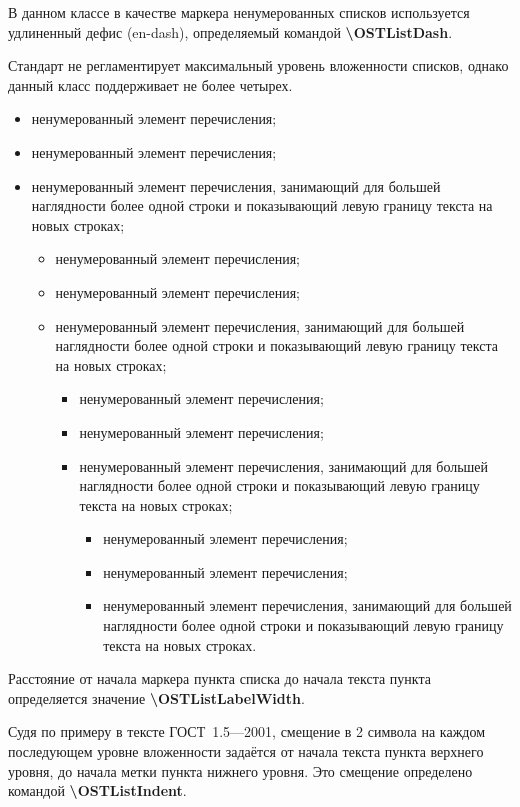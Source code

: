 \documentclass[12pt, twoside, final]{ruost}
\newcommand{\txtcmd}[1]{\textbf{\textbackslash{}#1}}
\begin{document}
\begin{OST}
				\point В данном классе в качестве маркера ненумерованных списков используется удлиненный дефис (en-dash), определяемый командой \txtcmd{OSTListDash}.
				
				\point Стандарт не регламентирует максимальный уровень вложенности списков, однако данный класс поддерживает не более четырех.
				
				\begin{itemize}
					\item ненумерованный элемент перечисления;
					\item ненумерованный элемент перечисления;
					\item ненумерованный элемент перечисления, занимающий для большей наглядности более одной строки и показывающий левую границу текста на новых строках;
					\begin{itemize}
						\item ненумерованный элемент перечисления;
						\item ненумерованный элемент перечисления;
						\item ненумерованный элемент перечисления, занимающий для большей наглядности более одной строки и показывающий левую границу текста на новых строках;
						\begin{itemize}
							\item ненумерованный элемент перечисления;
							\item ненумерованный элемент перечисления;
							\item ненумерованный элемент перечисления, занимающий для большей наглядности более одной строки и показывающий левую границу текста на новых строках;
							\begin{itemize}
								\item ненумерованный элемент перечисления;
								\item ненумерованный элемент перечисления;
								\item ненумерованный элемент перечисления, занимающий для большей наглядности более одной строки и показывающий левую границу текста на новых строках.
							\end{itemize}
						\end{itemize}
					\end{itemize}
				\end{itemize}
				
				\point Расстояние от начала маркера пункта списка до начала текста пункта определяется значение \txtcmd{OSTListLabelWidth}.
				
				\point Судя по примеру в тексте ГОСТ~1.5---2001, смещение в 2 символа на каждом последующем уровне вложенности задаётся от начала текста пункта верхнего уровня, до начала метки пункта нижнего уровня. Это смещение определено командой \txtcmd{OSTListIndent}.
				

\end{OST}
\end{document}
